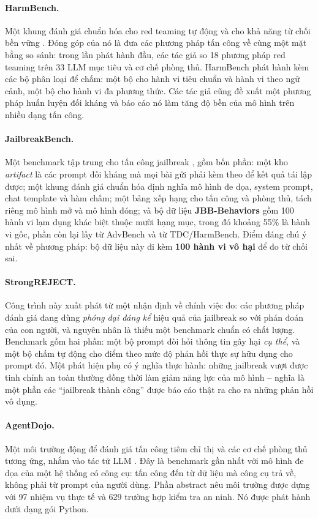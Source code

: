 \paragraph{HarmBench.} Một khung đánh giá chuẩn hóa cho red teaming tự động và cho khả năng từ chối bền vững \cite{mazeika2024harmbench}. Đóng góp của nó là đưa các phương pháp tấn công về cùng một mặt bằng so sánh: trong lần phát hành đầu, các tác giả so 18 phương pháp red teaming trên 33 LLM mục tiêu và cơ chế phòng thủ. HarmBench phát hành kèm các bộ phân loại để chấm: một bộ cho hành vi tiêu chuẩn và hành vi theo ngữ cảnh, một bộ cho hành vi đa phương thức. Các tác giả cũng đề xuất một phương pháp huấn luyện đối kháng và báo cáo nó làm tăng độ bền của mô hình trên nhiều dạng tấn công.

\paragraph{JailbreakBench.} Một benchmark tập trung cho tấn công jailbreak \cite{chao2024jailbreakbench}, gồm bốn phần: một kho \emph{artifact} là các prompt đối kháng mà mọi bài gửi phải kèm theo để kết quả tái lập được; một khung đánh giá chuẩn hóa định nghĩa mô hình đe dọa, system prompt, chat template và hàm chấm; một bảng xếp hạng cho tấn công và phòng thủ, tách riêng mô hình mở và mô hình đóng; và bộ dữ liệu \textbf{JBB-Behaviors} gồm 100 hành vi lạm dụng khác biệt thuộc mười hạng mục, trong đó khoảng 55\% là hành vi gốc, phần còn lại lấy từ AdvBench và từ TDC/HarmBench. Điểm đáng chú ý nhất về phương pháp: bộ dữ liệu này đi kèm \textbf{100 hành vi vô hại} để đo từ chối sai.

\paragraph{StrongREJECT.} Công trình này \cite{souly2024strongreject} xuất phát từ một nhận định về chính việc đo: các phương pháp đánh giá đang dùng \emph{phóng đại đáng kể} hiệu quả của jailbreak so với phán đoán của con người, và nguyên nhân là thiếu một benchmark chuẩn có chất lượng. Benchmark gồm hai phần: một bộ prompt đòi hỏi thông tin gây hại \emph{cụ thể}, và một bộ chấm tự động cho điểm theo mức độ phản hồi thực sự hữu dụng cho prompt đó. Một phát hiện phụ có ý nghĩa thực hành: những jailbreak vượt được tinh chỉnh an toàn thường đồng thời làm giảm năng lực của mô hình -- nghĩa là một phần các ``jailbreak thành công'' được báo cáo thật ra cho ra những phản hồi vô dụng.

\paragraph{AgentDojo.} Một môi trường động để đánh giá tấn công tiêm chỉ thị và các cơ chế phòng thủ tương ứng, nhắm vào tác tử LLM \cite{debenedetti2024agentdojo}. Đây là benchmark gần nhất với mô hình đe dọa của một hệ thống có công cụ: tấn công đến từ dữ liệu mà công cụ trả về, không phải từ prompt của người dùng. Phần abstract nêu môi trường được dựng với 97 nhiệm vụ thực tế và 629 trường hợp kiểm tra an ninh. Nó được phát hành dưới dạng gói Python.

